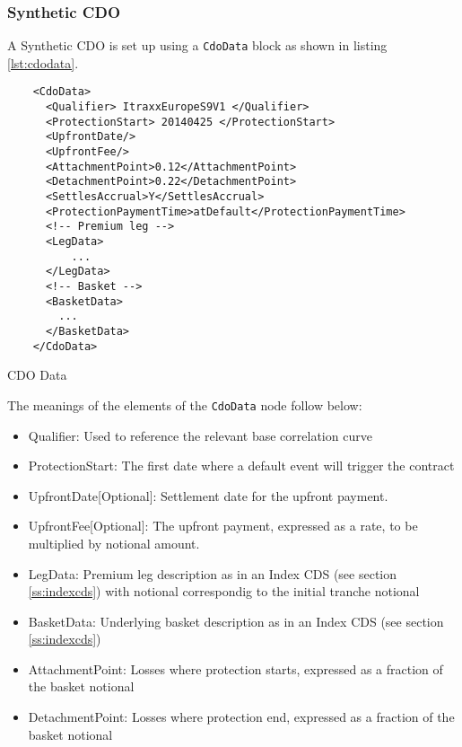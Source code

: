 \subsubsection{Synthetic CDO}

A Synthetic CDO is set up using a {\tt  CdoData} block as shown in listing 
\ref{lst:cdodata}.

\begin{listing}[H]
\begin{verbatim}
    <CdoData>
      <Qualifier> ItraxxEuropeS9V1 </Qualifier>
      <ProtectionStart> 20140425 </ProtectionStart>
      <UpfrontDate/>
      <UpfrontFee/>
      <AttachmentPoint>0.12</AttachmentPoint>
      <DetachmentPoint>0.22</DetachmentPoint>
      <SettlesAccrual>Y</SettlesAccrual>
      <ProtectionPaymentTime>atDefault</ProtectionPaymentTime>
      <!-- Premium leg -->
      <LegData>
          ...
      </LegData>
      <!-- Basket -->
      <BasketData>
        ...
      </BasketData>
    </CdoData>
\end{verbatim}
\caption{CDO Data}
\label{lst:cdodata}
\end{listing}

The meanings of the elements of the {\tt CdoData}  node follow below:

\begin{itemize}
\item Qualifier: Used to reference the relevant base correlation curve
\item ProtectionStart: The first date where a default event will
  trigger the contract
\item UpfrontDate[Optional]: Settlement date for the upfront payment.
\item UpfrontFee[Optional]: The upfront payment, expressed as a rate, to be multiplied by notional amount.
\item LegData: Premium leg description as in an Index CDS (see section
  \ref{ss:indexcds}) with notional correspondig to the initial tranche
  notional
\item BasketData: Underlying basket description as in an Index CDS  (see section
  \ref{ss:indexcds})
\item AttachmentPoint: Losses where protection starts, expressed as a
  fraction of the basket notional
\item DetachmentPoint: Losses where protection end, expressed as a
  fraction of the basket notional
\end{itemize}